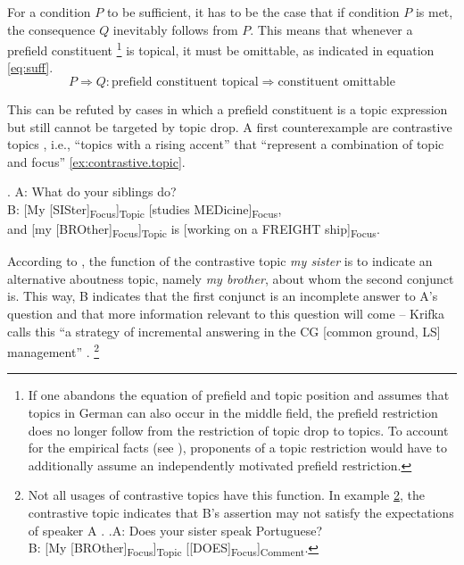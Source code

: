 For a condition $P$ to be sufficient, it has to be the case that if condition $P$ is met, the consequence $Q$ inevitably follows from $P$.
This means that whenever a prefield constituent%
\footnote{If one abandons the equation of prefield and topic position and assumes that topics in German can also occur in the middle field,  the prefield restriction does no longer follow from the restriction of topic drop to topics.
To account for the empirical facts (see ), proponents of a topic restriction would have to additionally assume an independently motivated prefield restriction.}
%
 is topical, it must be omittable, as indicated in equation \ref{eq:suff}.
\begin{equation}\label{eq:suff}
P \Rightarrow Q: \text{prefield constituent topical} \Rightarrow \text{constituent omittable}
\end{equation}

\noindent
This can be refuted by cases in which a prefield constituent is a topic expression but still cannot be targeted by topic drop.
A first counterexample are contrastive topics  \citep{buring1997}, i.e., ``topics with a rising accent'' that ``represent a combination of topic and focus''  \citep[44]{krifka2007} \ref{ex:contrastive.topic}.

\ex.\label{ex:contrastive.topic} A: What do your siblings do?\\
B: [My [SISter]\textsubscript{Focus}]\textsubscript{Topic} [studies MEDicine]\textsubscript{Focus}, \\
and [my [BROther]\textsubscript{Focus}]\textsubscript{Topic} is [working on a FREIGHT ship]\textsubscript{Focus}. \\\citep[44]{krifka2007}

According to \citet[44]{krifka2007}, the function of the contrastive topic  \textit{my sister} is to indicate an alternative aboutness topic, namely \textit{my brother}, about whom the second conjunct is.
This way, B indicates that the first conjunct is an incomplete answer to A's question and that more information relevant to this question will come -- Krifka calls this ``a strategy of incremental answering in the CG [common ground, LS] management'' \citep[44]{krifka2007}.%
\footnote{Not all usages of contrastive topics  have this function.
In example \ref{ex:contrastive.topic.2}, the contrastive topic indicates that B's assertion may not satisfy the expectations of speaker A \citep[45]{krifka2007}.
\ex.\label{ex:contrastive.topic.2}A: Does your sister speak Portuguese?\\
B: [My [BROther]\textsubscript{Focus}]\textsubscript{Topic} [[DOES]\textsubscript{Focus}]\textsubscript{Comment}.
\vspace{-0.75\baselineskip}
}

